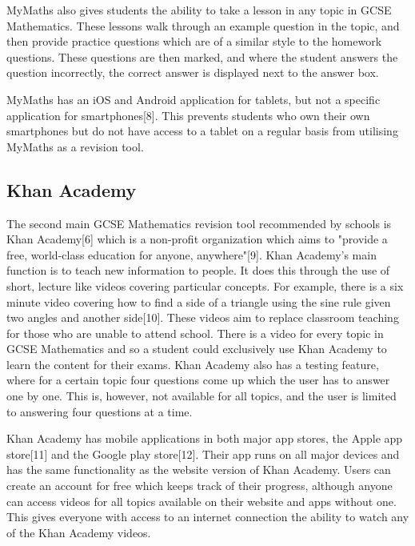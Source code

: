 \documentclass{article}
\begin{document}
MyMaths also gives students the ability to take a lesson in any topic in GCSE Mathematics. These lessons walk through an example question in the topic, and then provide practice questions which are of a similar style to the homework questions. These questions are then marked, and where the student answers the question incorrectly, the correct answer is displayed next to the answer box. \par

MyMaths has an iOS and Android application for tablets, but not a specific application for smartphones[8]. This prevents students who own their own smartphones but do not have access to a tablet on a regular basis from utilising MyMaths as a revision tool. \par

\subsection{Khan Academy}

The second main GCSE Mathematics revision tool recommended by schools is Khan Academy[6] which is a non-profit organization which aims to "provide a free, world-class education for anyone, anywhere"[9]. Khan Academy's main function is to teach new information to people. It does this through the use of short, lecture like videos covering particular concepts. For example, there is a six minute video covering how to find a side of a triangle using the sine rule given two angles and another side[10]. These videos aim to replace classroom teaching for those who are unable to attend school. There is a video for every topic in GCSE Mathematics and so a student could exclusively use Khan Academy to learn the content for their exams. Khan Academy also has a testing feature, where for a certain topic four questions come up which the user has to answer one by one. This is, however, not available for all topics, and the user is limited to answering four questions at a time. \par

Khan Academy has mobile applications in both major app stores, the Apple app store[11] and the Google play store[12]. Their app runs on all major devices and has the same functionality as the website version of Khan Academy. Users can create an account for free which keeps track of their progress, although anyone can access videos for all topics available on their website and apps without one. This gives everyone with access to an internet connection the ability to watch any of the Khan Academy videos. \par
\end{document}
